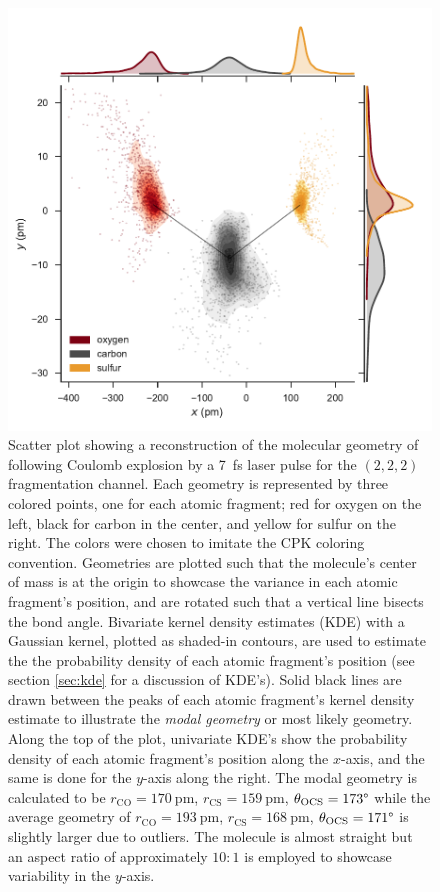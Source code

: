 \begin{figure}
  \centering
  \includegraphics[width=\textwidth]{Plots/OCS2227fsMOGeometry}
  \caption[Scatter plot showing a reconstruction of the molecular geometry of  following Coulomb explosion by a \SI{7}{\fs} laser pulse for the $(2,2,2)$ fragmentation channel.]
  {Scatter plot showing a reconstruction of the molecular geometry of  following Coulomb explosion by a \SI{7}{\fs} laser pulse for the $(2,2,2)$ fragmentation channel. Each geometry is represented by three colored points, one for each atomic fragment; red for oxygen on the left, black for carbon in the center, and yellow for sulfur on the right. The colors were chosen to imitate the CPK coloring convention. Geometries are plotted such that the molecule's center of mass is at the origin to showcase the variance in each atomic fragment's position, and are rotated such that a vertical line bisects the  bond angle. Bivariate kernel density estimates (KDE) with a Gaussian kernel, plotted as shaded-in contours, are used to estimate the the probability density of each atomic fragment's position (see section \ref{sec:kde} for a discussion of KDE's). Solid black lines are drawn between the peaks of each atomic fragment's kernel density estimate to illustrate the \emph{modal geometry} or most likely geometry. Along the top of the plot, univariate KDE's show the probability density of each atomic fragment's position along the $x$-axis, and the same is done for the $y$-axis along the right. The modal geometry is calculated to be $r_\mathrm{CO} = \SI{170}{\pico\m}$, $r_\mathrm{CS} = \SI{159}{\pm}$, $ \theta_\mathrm{OCS} = 173\degree$ while the average geometry of $r_\mathrm{CO} = \SI{193}{\pico\m}$, $r_\mathrm{CS} = \SI{168}{\pico\m}$, $ \theta_\mathrm{OCS} = 171\degree$ is slightly larger due to outliers. The molecule is almost straight but an aspect ratio of approximately $10:1$ is employed to showcase variability in the $y$-axis.}
  \label{fig:OCS2227fsMOGeometry}
\end{figure}

